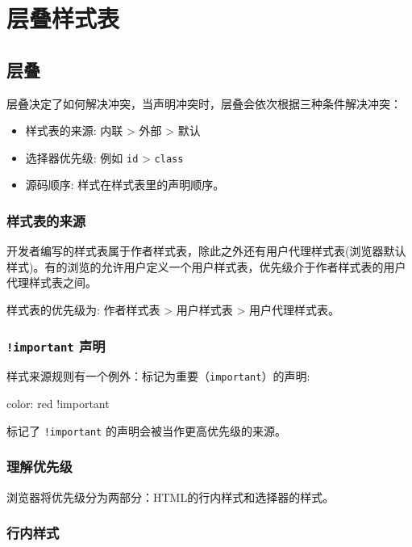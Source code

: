 \section{层叠样式表}

\subsection{层叠}

层叠决定了如何解决冲突，当声明冲突时，层叠会依次根据三种条件解决冲突：
\begin{itemize}
    \item 样式表的来源: 内联 > 外部 > 默认
    \item 选择器优先级: 例如 \texttt{id} > \texttt{class}
    \item 源码顺序: 样式在样式表里的声明顺序。
\end{itemize}

\subsubsection{样式表的来源}

开发者编写的样式表属于作者样式表，除此之外还有用户代理样式表(浏览器默认样式)。有的浏览的允许用户定义一个用户样式表，优先级介于作者样式表的用户代理样式表之间。

样式表的优先级为: 作者样式表 > 用户样式表 > 用户代理样式表。

\subsubsection*{\texttt{!important} 声明}

样式来源规则有一个例外：标记为重要（\texttt{important}）的声明:

\begin{HTML}
color: red !important
\end{HTML}

标记了 \texttt{!important} 的声明会被当作更高优先级的来源。

\subsubsection{理解优先级}

浏览器将优先级分为两部分：HTML的行内样式和选择器的样式。

\subsubsection*{行内样式}

